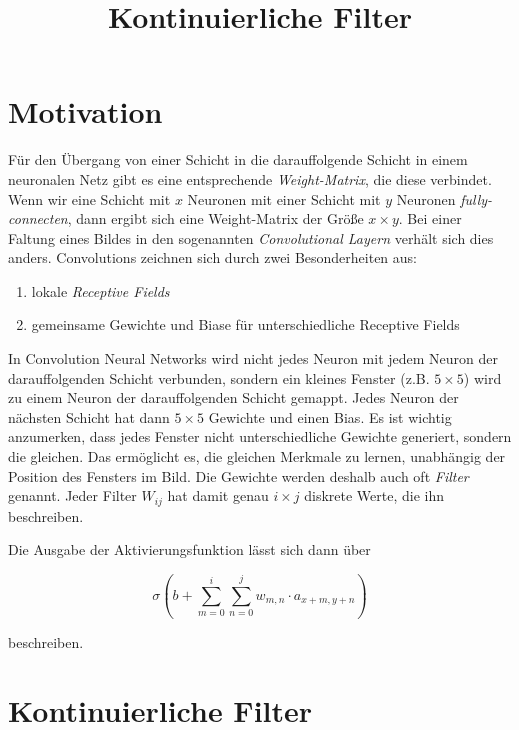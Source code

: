 \documentclass{scrartcl}
\title{Kontinuierliche Filter}
\begin{document}
\maketitle

\section{Motivation}

Für den Übergang von einer Schicht in die darauffolgende Schicht in einem neuronalen Netz gibt es eine entsprechende \emph{Weight-Matrix}, die diese verbindet.
Wenn wir eine Schicht mit $x$ Neuronen mit einer Schicht mit $y$ Neuronen \emph{fully-connecten}, dann ergibt sich eine Weight-Matrix der Größe $x \times y$.
Bei einer Faltung eines Bildes in den sogenannten \emph{Convolutional Layern} verhält sich dies anders.
Convolutions zeichnen sich durch zwei Besonderheiten aus:

\begin{enumerate}
  \item lokale \emph{Receptive Fields}
  \item gemeinsame Gewichte und Biase für unterschiedliche Receptive Fields
\end{enumerate}

In Convolution Neural Networks wird nicht jedes Neuron mit jedem Neuron der darauffolgenden Schicht verbunden, sondern ein kleines Fenster (z.B. $5 \times 5$) wird zu einem Neuron der darauffolgenden Schicht gemappt.
Jedes Neuron der nächsten Schicht hat dann $5 \times 5$ Gewichte und einen Bias.
Es ist wichtig anzumerken, dass jedes Fenster nicht unterschiedliche Gewichte generiert, sondern die gleichen.
Das ermöglicht es, die gleichen Merkmale zu lernen, unabhängig der Position des Fensters im Bild.
Die Gewichte werden deshalb auch oft \emph{Filter} genannt.
Jeder Filter $W_{ij}$ hat damit genau $i \times j$ diskrete Werte, die ihn beschreiben.

Die Ausgabe der Aktivierungsfunktion lässt sich dann über

\begin{equation}
  \sigma \left( b + \sum_{m = 0}^i \sum_{n = 0}^j w_{m,n} \cdot a_{x+m, y+n} \right)
\end{equation}

beschreiben.

\section{Kontinuierliche Filter}
\end{document}
